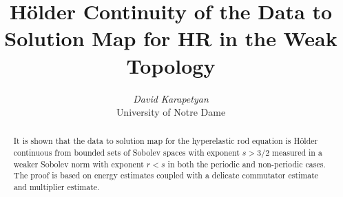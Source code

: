 \documentclass[12pt,reqno]{amsart}
\numberwithin{equation}{section}  %
\numberwithin{figure}{section}
\begin{document}
\title{H\"older Continuity of the Data to Solution Map for HR in the
Weak Topology}
\author{\textit{David Karapetyan} \\ University of Notre Dame}
\address{Department of Mathematics  \\
University of Notre Dame\\
Notre Dame, IN 46556 }
\date{}
\begin{abstract}
It is shown that the data to solution map for the hyperelastic rod equation is
H\"older continuous from bounded sets of Sobolev spaces with exponent $s > 3/2$
measured in a weaker Sobolev norm with exponent $r < s$ in both the
periodic and non-periodic cases. The proof is based on energy estimates coupled
with a delicate commutator estimate and multiplier estimate. 
\end{abstract}
%
\maketitle
{}
%
%
%
%
%
%        
%
\end{document}
